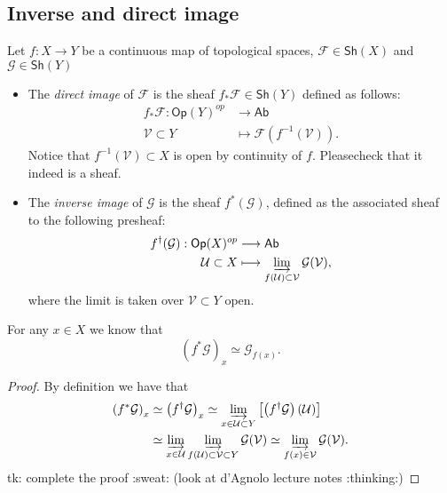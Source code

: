 \documentclass[../Main]{subfiles}
\begin{document}
\subsection{Inverse and direct image}
\begin{defn}
Let $f\colon X \to Y$ be a continuous map of topological spaces,
$\mathcal{F} \in \mathsf{Sh}\left(X\right)$ and $\mathcal{G} \in \mathsf{Sh}\left(Y\right)$
\begin{itemize}
	\item The {\em direct image} of $\mathcal{F}$ is the sheaf $f_* \mathcal{F} \in \mathsf{Sh}\left(Y\right)$
		defined as follows:
		\begin{align}
			f_* \mathcal{F}: \mathsf{Op}(Y)^{op} &\longrightarrow \mathsf{Ab} \\
			\mathcal{V} \subset Y &\longmapsto \mathcal{F} \left( f^{-1}(\mathcal{V}) \right) \nonumber
		.\end{align} 
		Notice that $f^{-1}(\mathcal{V}) \subset X$ is open
		by continuity of $f$.
		Pleasecheck that it indeed is a sheaf.
	\item The {\em inverse image} of $\mathcal{G}$ is the sheaf $f^*(\mathcal{G})$,
		defined as the associated sheaf to the following presheaf:
		\begin{align}
			f^\dagger(\mathcal{G}): \mathsf{Op}(X)^{op} &\longrightarrow \mathsf{Ab} \\
			\mathcal{U} \subset X &\longmapsto \varinjlim_{f(\mathcal{U}) \subset \mathcal{V}}
			\mathcal{G}(\mathcal{V})\nonumber
		,\end{align} 
		where the limit is taken over $\mathcal{V} \subset Y$ open.
\end{itemize} 
\end{defn}
\begin{prop}[]
	For any $x \in X$ we know that
	\begin{equation}
		\left( f^*\mathcal{G} \right)_x \simeq 
		\mathcal{G}_{f(x)}
	.\end{equation} 
\end{prop}
\begin{proof}
	By definition we have that
	\begin{align}
		\left( f^*\mathcal{G} \right)_x &\simeq
		\left( f^\dagger\mathcal{G} \right)_x \simeq 
		\varinjlim_{x \in \mathcal{U} \subset Y} \left[ \left( f^\dagger \mathcal{G} \right)\left( \mathcal{U} \right) \right]\\
		&\simeq \varinjlim_{x \in \mathcal{U}}
		\varinjlim_{f(\mathcal{U}) \subset \mathcal{V} \subset Y} \mathcal{G}(\mathcal{V})
		\simeq \varinjlim_{f(x) \in \mathcal{V}} \mathcal{G}(\mathcal{V})
	.\end{align} 
	tk: complete the proof :sweat:
	(look at d'Agnolo lecture notes :thinking:)
\end{proof}
\end{document}
